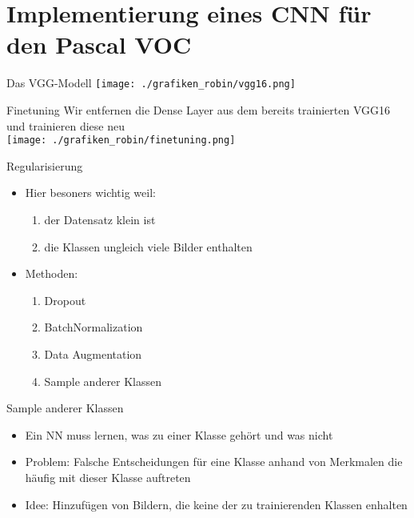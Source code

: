 \section{Implementierung eines CNN für den Pascal VOC}
\frame{\sectionpage}
\begin{frame}{Das VGG-Modell}
\texttt{[image: ./grafiken\_robin/vgg16.png]}
\end{frame}

\begin{frame}{Finetuning}
Wir entfernen die Dense Layer aus dem bereits trainierten VGG16 und trainieren diese neu\\
\vspace*{0.5cm}
\texttt{[image: ./grafiken\_robin/finetuning.png]}
\end{frame}

\begin{frame}{Regularisierung}
\begin{itemize}
\item Hier besoners wichtig weil: 
\begin{enumerate}
\item der Datensatz klein ist
\item die Klassen ungleich viele Bilder enthalten
\end{enumerate}
\item Methoden:
\begin{enumerate}
\item Dropout
\item BatchNormalization
\item Data Augmentation
\item Sample anderer Klassen
\end{enumerate}
\end{itemize}
\end{frame}

\begin{frame}{Sample anderer Klassen}
\begin{itemize}
\item Ein NN muss lernen, was zu einer Klasse gehört und was nicht
\item Problem: Falsche Entscheidungen für eine Klasse anhand von Merkmalen die häufig mit dieser Klasse auftreten
\item Idee: Hinzufügen von Bildern, die keine der zu trainierenden Klassen enhalten
\end{itemize}
\end{frame}

